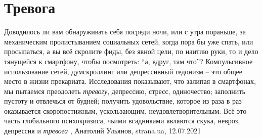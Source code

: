  
 
 
 
 
\chapter{Тревога}


Доводилось ли вам обнаруживать себя посреди ночи, или с утра пораньше, за
механическим пролистыванием социальных сетей, когда пора бы уже спать, или
просыпаться, а вы всё скролите фиды, без явной цели, по наитию руки, то и дело
тянущейся к смартфону, чтобы посмотреть: \enquote{а, вдруг, там что}?
Компульсивное использование сетей, думскроллинг или депрессивный гедонизм – это
общее место в жизни прекариата. Исследования показывают, что залипая в
смартфонах, мы пытаемся преодолеть \emph{тревогу}, депрессию, стресс, одиночество;
заполнить пустоту и отвлечься от будней; получить удовольствие, которое из раза
в раз оказывается скоропостижным, ускользающим, неудовлетворительным.
Всё это – часть глобального психокризиса, чьими всадниками являются скука,
невроз, депрессия и \emph{тревога}
, 
Анатолий Ульянов, strana.ua, 12.07.2021

